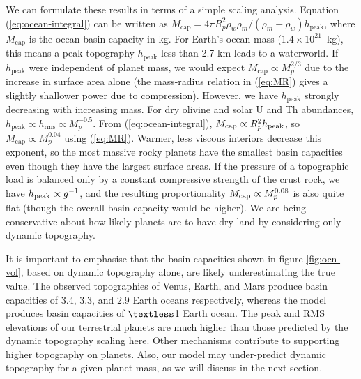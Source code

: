 \documentclass[trackchanges]{aastex63}
\newcommand{\todo}[1]{\textit{\textcolor{violet}{{#1}}}}
\begin{document}
We can formulate these results in terms of a simple scaling analysis. Equation (\ref{eq:ocean-integral}) can be written as $M_\text{cap} = 4 \pi R_p^2 \rho_w  \rho_m / (\rho_m - \rho_w) h_{\text{peak}}$, where $M_\text{cap}$ is the ocean basin capacity in kg. For Earth's ocean mass ($1.4 \times 10^{21}$~kg), this means a peak topography $h_{\text{peak}}$ less than 2.7 km leads to a waterworld. If $h_{\text{peak}}$ were independent of planet mass, we would expect $M_\text{cap} \propto M_p^{2/3}$ due to the increase in surface area alone (the mass-radius relation in (\ref{eq:MR}) gives a slightly shallower power due to compression). However, we have $h_{\text{peak}}$ strongly decreasing with increasing mass. For dry olivine and solar U and Th abundances, $h_{\text{peak}} \propto h_{\text{rms}} \propto M_p^{-0.5}$. From (\ref{eq:ocean-integral}), $M_\text{cap} \propto R_p^2 h_{\rm peak}$, so $M_\text{cap} \propto M_p^{0.04}$ using (\ref{eq:MR}). Warmer, less viscous interiors decrease this exponent, so the most massive rocky planets have the smallest basin capacities even though they have the largest surface areas. If the pressure of a topographic load is balanced only by a constant compressive strength of the crust rock, we have $h_{\rm peak} \propto g^{-1}$, and the resulting proportionality $M_{\rm cap} \propto M_p^{0.08}$ is also quite flat (though the overall basin capacity would be higher). We are being conservative about how likely planets are to have dry land by considering only dynamic topography.

It is important to emphasise that the basin capacities shown in figure \ref{fig:ocn-vol}, based on dynamic topography alone, are likely underestimating the true value. The observed topographies of Venus, Earth, and Mars produce basin capacities of 3.4, 3.3, and 2.9 Earth oceans respectively, whereas the model produces basin capacities of $\textless$1 Earth ocean. The peak and RMS elevations of our terrestrial planets are much higher than those predicted by the dynamic topography scaling here. Other mechanisms contribute to supporting higher topography on planets. Also, our model may under-predict dynamic topography for a given planet mass, as we will discuss in the next section.






\end{document}
